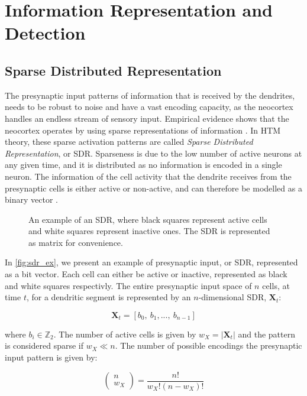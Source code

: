 \section{Information Representation and Detection}
\subsection{Sparse Distributed Representation}
The presynaptic input patterns of information that is received by the dendrites, needs to be robust to noise and have a vast encoding capacity, as the neocortex handles an endless stream of sensory input. Empirical evidence shows that the neocortex operates by using sparse representations of information \cite{DBLP:journals/corr/AhmadH16}. In HTM theory, these sparse activation patterns are called \textit{Sparse Distributed Representation}, or SDR. Sparseness is due to the low number of active neurons at any given time, and it is distributed as no information is encoded in a single neuron. The information of the cell activity that the dendrite receives from the presynaptic cells is either active or non-active, and can therefore be modelled as a binary vector \cite{DBLP:journals/corr/AhmadH16}. 


\begin{figure}[ht!]
    \centering
    \resizebox{\textwidth}{!}{}
    \caption{An example of an SDR, where black squares represent active cells and white squares represent inactive ones. The SDR is represented as matrix for convenience.}
    \label{fig:sdr_ex}
\end{figure}


In \autoref{fig:sdr_ex}, we present an example of presynaptic input, or SDR, represented as a bit vector. Each cell can either be active or inactive, represented as black and white squares respectivly. The entire presynaptic input space of $n$ cells, at time $t$, for a dendritic segment is represented by an $n$-dimensional SDR, $\boldsymbol{X}_t$:


\begin{equation}
    \boldsymbol{X}_t = [b_0,\ b_1,...,\ b_{n-1}]
\end{equation}


\noindent where $b_i \in \mathbb{Z}_2$. The number of active cells is given by $w_X = | \boldsymbol{X}_t |$ and the pattern is considered sparse if $w_X \ll n$. The number of possible encodings the presynaptic input pattern is given by:


\begin{equation}
    \begin{pmatrix} n \\ w_X \end{pmatrix} = \frac{n!}{w_X!(n-w_X)!}
\end{equation}


